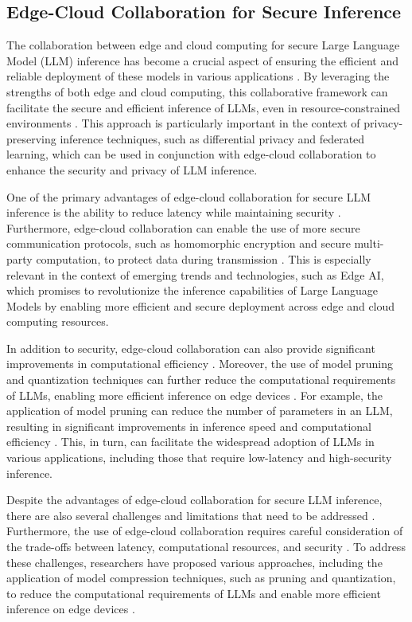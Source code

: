\documentclass[11pt,a4paper]{article}
\begin{document}
\subsection{Edge-Cloud Collaboration for Secure Inference}


The collaboration between edge and cloud computing for secure Large Language Model (LLM) inference has become a crucial aspect of ensuring the efficient and reliable deployment of these models in various applications \cite{doi:10.1109/twc.2022.3165824}. By leveraging the strengths of both edge and cloud computing, this collaborative framework can facilitate the secure and efficient inference of LLMs, even in resource-constrained environments \cite{doi:10.3390/electronics12173598}. This approach is particularly important in the context of privacy-preserving inference techniques, such as differential privacy and federated learning, which can be used in conjunction with edge-cloud collaboration to enhance the security and privacy of LLM inference.

One of the primary advantages of edge-cloud collaboration for secure LLM inference is the ability to reduce latency while maintaining security \cite{doi:10.1109/access.2024.3409745}. Furthermore, edge-cloud collaboration can enable the use of more secure communication protocols, such as homomorphic encryption and secure multi-party computation, to protect data during transmission \cite{arxiv:2309.14717}. This is especially relevant in the context of emerging trends and technologies, such as Edge AI, which promises to revolutionize the inference capabilities of Large Language Models by enabling more efficient and secure deployment across edge and cloud computing resources.

In addition to security, edge-cloud collaboration can also provide significant improvements in computational efficiency \cite{arxiv:2306.11695}. Moreover, the use of model pruning and quantization techniques can further reduce the computational requirements of LLMs, enabling more efficient inference on edge devices \cite{arxiv:2407.00928}. For example, the application of model pruning can reduce the number of parameters in an LLM, resulting in significant improvements in inference speed and computational efficiency \cite{arxiv:2405.18377}. This, in turn, can facilitate the widespread adoption of LLMs in various applications, including those that require low-latency and high-security inference.

Despite the advantages of edge-cloud collaboration for secure LLM inference, there are also several challenges and limitations that need to be addressed \cite{arxiv:2405.12532}. Furthermore, the use of edge-cloud collaboration requires careful consideration of the trade-offs between latency, computational resources, and security \cite{arxiv:2405.14371}. To address these challenges, researchers have proposed various approaches, including the application of model compression techniques, such as pruning and quantization, to reduce the computational requirements of LLMs and enable more efficient inference on edge devices \cite{doi:10.1016/j.future.2025.108056}.
\end{document}
